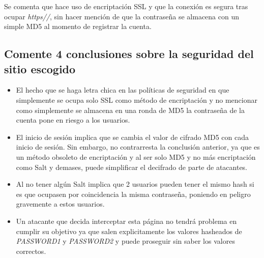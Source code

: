 \documentclass[letter,12pt]{article}
\begin{document}
Se comenta que hace uso de encriptación SSL y que la conexión es segura tras ocupar \textit{https//}, sin hacer mención de que la contraseña se almacena con un simple MD5 al momento de registrar la cuenta.

\subsection{Comente 4 conclusiones sobre la seguridad del sitio escogido}

\begin{itemize}
    \item El hecho que se haga letra chica en las políticas de seguridad en que simplemente se ocupa solo SSL como método de encriptación y no mencionar como simplemente se almacena en una ronda de MD5 la contraseña de la cuenta pone en riesgo a los usuarios.
    \item El inicio de sesión implica que se cambia el valor de cifrado MD5 con cada inicio de sesión. Sin embargo, no contrarresta la conclusión anterior, ya que es un método obsoleto de encriptación y al ser solo MD5 y no más encriptación como Salt y demases, puede simplificar el decifrado de parte de atacantes.
    \item Al no tener algún Salt implica que 2 usuarios pueden tener el mismo hash si es que ocupasen por coincidencia la misma contraseña, poniendo en peligro gravemente a estos usuarios.
    \item Un atacante que decida interceptar esta página no tendrá problema en cumplir su objetivo ya que salen explicitamente los valores hasheados de \textit{PASSWORD1} y \textit{PASSWORD2} y puede proseguir sin saber los valores correctos.
\end{itemize}

\end{document}
